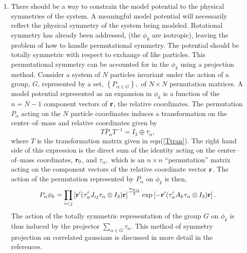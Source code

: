\begin{enumerate}
\item  There should be a way to constrain the model potential to the
physical symmetries of the system.
A meaningful model potential will necessarily reflect the physical symmetry
of the system being modeled. Rotational symmetry has already been addressed,
(the $\phi _k$ are isotropic), leaving the problem of how to handle
permutational symmetry. The potential should be totally symmetric with
respect to exchange of like particles. This permutational symmetry can be
accounted for in the $\phi _k$ using a projection method. Consider a system
of $N$ particles invariant under the action of a group, $G$, represented by
a set, $\left\{ P_{\alpha \in G}\right\} ,$ of $N\times N$ permutation
matrices. A model potential represented as an expansion in $\phi _k$ is a
function of the $n=N-1$ component vectors of ${\bf r}$, the relative
coordinates. The permutation $P_\alpha $ acting on the $N$ particle
coordinates induces a transformation on the center--of--mass and relative
coordinates given by 
\begin{equation}
T\bar{P}_\alpha T^{-1}=I_3\oplus \bar{\tau}_\alpha,
\end{equation}
where $T$ is the transformation matrix given in eqn(\ref{Ttran}). 
The right hand side of this 
expression is the direct sum of the identity acting on the
center--of--mass coordinates, ${\bf r}_0$, and $\tau _\alpha ,$ which is an 
$n\times n$ ``permutation'' matrix acting on the component vectors of the
relative coordinate vector ${\bf r}$. The action of the permutation
represented by $P_\alpha $ on $\phi _k$ is then, 
\begin{equation}
P_\alpha \phi _k=\prod_{i<j}\left[ {\bf r}^{\prime }(\tau _\alpha
^{\prime }J_{ij}\tau _\alpha \otimes I_3){\bf r}\right] ^{\frac{m_{kij}}%
2}\exp \left[ -{\bf r}^{\prime }(\tau _\alpha ^{\prime }A_k\tau _\alpha
\otimes I_3){\bf r}\right] .
\end{equation}
The action of the totally symmetric representation of the group $G$ on $\phi
_k$ is thus induced by the projector $\sum_{\alpha \in G}\tau _\alpha .$
This method of symmetry projection on correlated gaussians is discussed in
more detail in the references\cite{Kinghorn93,Kinghorn95b,Poshusta83}.


\end{enumerate}

